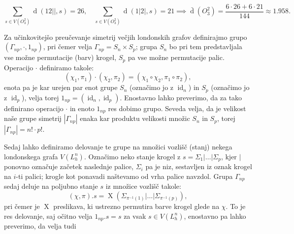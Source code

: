 \documentclass[12pt,a4paper]{amsart}
\theoremstyle{definition} %
\theoremstyle{plain} %
\DeclareMathOperator {\id} {id}
\DeclareMathOperator {\X}{X}
\DeclareMathOperator{\distance}{d}
\begin{document}
\[ \sum_{s \in V(O_3^2)} \distance(12||,s) = 26,\quad \sum_{s \in V(O_3^2)} \distance(1|2|,s) = 21 \implies \bar{\distance}(O^2_3) = \frac{6 \cdot 26 + 6 \cdot 21}{144} \approx 1.958.\]


Za učinkovitejšo preučevanje simetrij večjih londonskih grafov definirajmo grupo $(\Gamma_{np}, \cdot, 1_{np})$, pri čemer velja $\Gamma_{np} = S_n \times S_p$; grupa $S_n$ bo pri tem predstavljala vse možne permutacije (barv) krogel, $S_p$ pa vse možne permutacije palic. Operacijo $\cdot$ definiramo takole:
\[ (\chi_1,\pi_1) \cdot (\chi_2,\pi_2) = (\chi_1 \circ \chi_2,\pi_1 \circ \pi_2), \]
enota pa je kar urejen par enot grupe $S_n$ (označimo jo z $\id_n$) in $S_p$ (označimo jo z $\id_p$), velja torej $1_{np} = (\id_n, \id_p) $. Enostavno lahko preverimo, da za tako definirano operacijo $\cdot$ in enoto $1_{np}$ res dobimo grupo. Seveda velja, da je velikost naše grupe simetrij $|\Gamma_{np}|$ enaka kar produktu velikosti množic $S_n$ in $S_p$, torej $|\Gamma_{np}| = n! \cdot p!$. 

Sedaj lahko definiramo delovanje te grupe na množici vozlišč (stanj) nekega londonskega grafa $V(L_h^n)$. Označimo neko stanje krogel z $s = \Sigma_1 | \ldots | \Sigma_p$, kjer $|$ ponovno označuje začetek naslednje palice, $\Sigma_i$ pa je niz, sestavljen iz oznak krogel na $i$-ti palici; krogle kot ponavadi naštevamo od vrha palice navzdol. Grupa $\Gamma_{np}$ sedaj deluje na poljubno stanje $s$ iz množice vozlišč takole:
\[ (\chi,\pi) . s = \X \left( \Sigma_{\pi^{-1}(1)} | \ldots | \Sigma_{\pi^{-1}(p)} \right), \]
pri čemer je $\X$ preslikava, ki ustrezno permutira barve krogel glede na $\chi$. To je res delovanje, saj očitno velja $1_{np}.s = s$ za vsak $s \in V(L_h^n)$, enostavno pa lahko preverimo, da velja tudi
\end{document}
